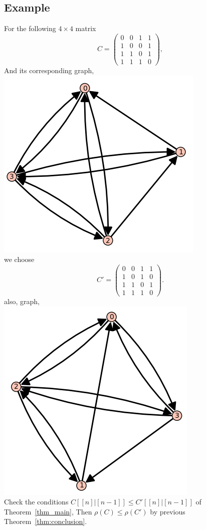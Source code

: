 \documentclass{article}
\theoremstyle{plain}
\theoremstyle{definition}
\begin{document}
\subsection{Example}
    For the following $4\times 4$ matrix
    $$C=\begin{pmatrix}
    0 & 0 & 1 & 1\\
    1 & 0 & 0 & 1\\
    1 & 1 & 0 & 1\\
    1 & 1 & 1 & 0
    \end{pmatrix},$$
    And its corresponding graph,\cite[sage]{sage}\\
    \includegraphics{graph_C.PNG} \\
    we choose
    $$C'=\begin{pmatrix}
    0 & 0 & 1 & 1\\
    1 & 0 & 1 &  0\\
    1 & 1 & 0 & 1\\
    1 & 1 & 1 & 0
    \end{pmatrix}.$$
    also, graph,\cite[sage]{sage}\\
    \includegraphics{graph_Cprime.PNG} \\
    Check the conditions $C[[n]|[n-1]]  \leq C'[[n]|[n-1]] $ of Theorem~\ref{thm_main},
    Then
    $\rho(C)\leq \rho(C')$ by previous Theorem~\ref{thm:conclusion}.
\end{document}
